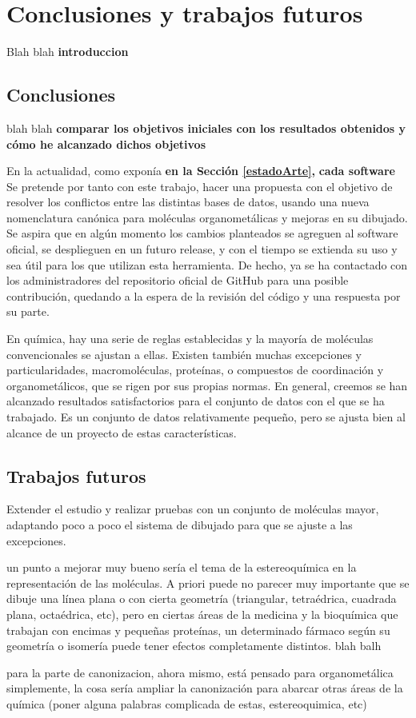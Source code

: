 \chapter{Conclusiones y trabajos futuros}

Blah blah \textbf{introduccion}

\section{Conclusiones}

blah blah \textbf{comparar los objetivos iniciales con los resultados obtenidos y cómo he alcanzado dichos objetivos}

En la actualidad, como exponía \textbf{en la Sección \ref{estadoArte}, } \textbf{cada software }
Se pretende por tanto con este trabajo, hacer una propuesta con el objetivo de resolver los conflictos entre las distintas bases de datos, usando una nueva nomenclatura canónica para moléculas organometálicas y mejoras en su dibujado.
Se aspira que en algún momento los cambios planteados se agreguen al software oficial, se desplieguen en un futuro release, y con el tiempo se extienda su uso y sea útil para los que utilizan esta herramienta. De hecho, ya se ha contactado con los administradores del repositorio oficial de GitHub para una posible contribución, quedando a la espera de la revisión del código y una respuesta por su parte.

En química, hay una serie de reglas establecidas y la mayoría de moléculas convencionales se ajustan a ellas. Existen también muchas excepciones y particularidades, macromoléculas, proteínas, o compuestos de coordinación y organometálicos, que se rigen por sus propias normas. En general, creemos se han alcanzado resultados satisfactorios para el conjunto de datos con el que se ha trabajado. Es un conjunto de datos relativamente pequeño, pero se ajusta bien al alcance de un proyecto de estas características. 



\section{Trabajos futuros}

Extender el estudio y realizar pruebas con un conjunto de moléculas mayor, adaptando poco a poco el sistema de dibujado para que se ajuste a las excepciones.

un punto a mejorar muy bueno sería el tema de la estereoquímica en la representación de las moléculas. A priori puede no parecer muy importante que se dibuje una línea plana o con cierta geometría (triangular, tetraédrica, cuadrada plana, octaédrica, etc), pero en ciertas áreas de la medicina y la bioquímica que trabajan con encimas y pequeñas proteínas, un determinado fármaco según su geometría o isomería puede tener efectos completamente distintos.
blah balh

para la parte de canonizacion, ahora mismo, está pensado para organometálica simplemente, la cosa sería ampliar la canonización para abarcar otras áreas de la química (poner alguna palabras complicada de estas, estereoquimica, etc)